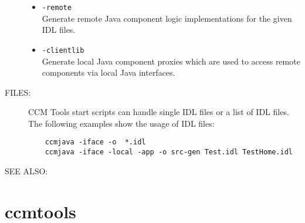 \begin{description}
\begin{itemize}
  \item {\tt -remote } \\
  	Generate remote Java component logic implementations for the given IDL files.
  
  \item {\tt -clientlib } \\
	Generate local Java component proxies which are used to access remote
	components via local Java interfaces.
  \end{itemize}
    
  \item [FILES:]
  CCM Tools start scripts can handle single IDL files or a list of IDL
  files. The following examples show the usage of IDL files: 
  \begin{verbatim}
    ccmjava -iface -o  *.idl
    ccmjava -iface -local -app -o src-gen Test.idl TestHome.idl
  \end{verbatim}  
  
\item [SEE ALSO:]
\end{description}





\newpage
\section{ccmtools}

